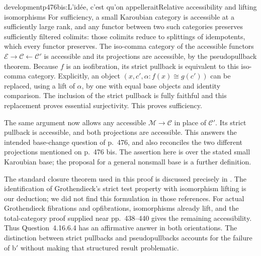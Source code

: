 \begin{dcomment}{development}{p476bis:L'idée, c'est qu'on appellerait}{Relative accessibility and lifting isomorphisms}
For sufficiency, a small Karoubian category is accessible at a sufficiently large rank, and any functor between two such categories preserves sufficiently filtered colimits: those colimits reduce to splittings of idempotents, which every functor preserves. The iso-comma category of the accessible functors $\mathcal E\to\mathcal C\leftarrow\mathcal C'$ is accessible and its projections are accessible, by the pseudopullback theorem. Because $f$ is an isofibration, its strict pullback is equivalent to this iso-comma category. Explicitly, an object $(x,c',\alpha:f(x)\cong g(c'))$ can be replaced, using a lift of $\alpha$, by one with equal base objects and identity comparison. The inclusion of the strict pullback is fully faithful and this replacement proves essential surjectivity. This proves sufficiency.

The same argument now allows any accessible $\mathcal M\to\mathcal C$ in place of $\mathcal C'$. Its strict pullback is accessible, and both projections are accessible. This answers the intended base-change question of p.~476, and also reconciles the two different projections mentioned on p.~476 bis. The assertion here is over the stated small Karoubian base; the proposal for a general nonsmall base is a further definition.

The standard closure theorem used in this proof is discussed precisely in \citet[Examples~4.8 and Remark~4.9]{BourkeLack2024}. The identification of Grothendieck's strict test property with isomorphism lifting is our deduction; we did not find this formulation in those references. For actual Grothendieck fibrations and opfibrations, isomorphisms already lift, and the total-category proof supplied near pp.~438--440 gives the remaining accessibility. Thus Question~4.16.6.4 has an affirmative answer in both orientations. The distinction between strict pullbacks and pseudopullbacks accounts for the failure of b$'$ without making that structured result problematic.
\end{dcomment}

